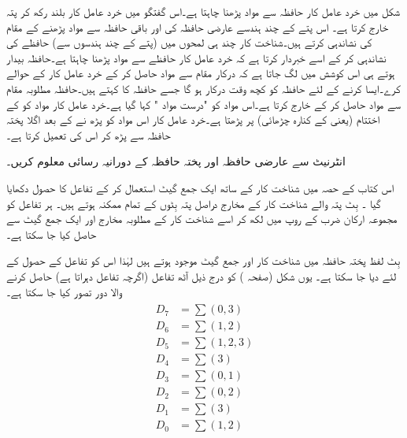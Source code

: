 شکل    میں خرد عامل کار حافظہ سے مواد پڑھنا چاہتا ہے۔اس گفتگو میں خرد عامل کار  بلند رکھ کر پتہ خارج کرتا ہے۔ اس  پتے کے چند ہندسے عارضی حافظہ کی اور باقی حافظہ سے مواد پڑھنے کے مقام کی نشاندہی کرتے ہیں۔شناخت کار چند ہی لمحوں میں (پتے کے چند ہندسوں سے) حافظے کی نشاندہی کر کے اسے خبردار کرتا ہے کہ خرد عامل کار حافظے سے مواد پڑھنا چاہتا ہے۔حافظہ بیدار ہوتے ہی اس کوشش میں لگ جاتا ہے کہ درکار مقام سے مواد حاصل کر کے خرد عامل کار کے حوالے کرے۔ایسا کرنے کے لئے حافظہ کو کچھ وقت درکار ہو گا جسے حافظہ کا  کہتے ہیں۔حافظہ مطلوبہ مقام سے مواد حاصل کر کے خارج کرتا ہے۔اس مواد کو "درست مواد " کہا گیا ہے۔خرد عامل کار مواد کو  کے اختتام  (یعنی  کے کنارہ چڑھائی)     پر پڑھتا ہے۔خرد عامل کار اس مواد کو پڑھ نے کے بعد  اگلا   پختہ حافظہ سے پڑھ کر   اس کی تعمیل کرتا ہے۔

انٹرنیٹ سے عارضی حافظہ   اور پختہ حافظہ    کے دورانیہ رسائی معلوم  کریں۔

اس کتاب کے حصہ  میں شناخت کار کے ساتھ ایک جمع گیٹ استعمال کر کے تفاعل کا حصول دکھایا گیا ۔  بِٹ پتہ والے شناخت کار کے  مخارج دراصل پتہ بِٹوں کے تمام ممکنہ  ہوتے ہیں۔ ہر تفاعل کو مجموعہ ارکان ضرب کے روپ میں لکھ کر اسے شناخت کار کے مطلوبہ مخارج اور ایک جمع گیٹ سے حاصل کیا جا سکتا ہے۔ 

 بِٹ لفظ پختہ حافظہ میں شناخت کار اور  جمع گیٹ موجود ہوتے ہیں لہٰذا اس کو  تفاعل کے حصول کے لئے  دیا جا سکتا ہے۔ یوں شکل    (صفحہ ) کو درج ذیل آٹھ تفاعل (اگرچہ  تفاعل  دہراتا ہے) حاصل کرنے والا دور تصور کیا جا سکتا ہے۔
\begin{gather}
\begin{aligned}
D_7&=\sum (0,3)\\
D_6&=\sum(1,2)\\
D_5&=\sum (1,2,3)\\
D_4&=\sum(3)\\
D_3&=\sum(0,1)\\
D_2&=\sum (0,2)\\
D_1&=\sum(3)\\
D_0&=\sum(1,2)
\end{aligned}
\end{gather}

